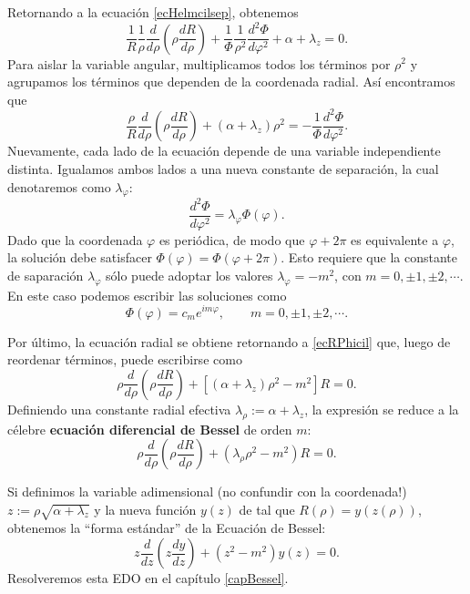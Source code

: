 Retornando a la ecuación \eqref{ecHelmcilsep}, obtenemos
\begin{equation}
\frac{1}{R}\frac{1}{\rho}\frac{d}{d \rho}\left(\rho \frac{dR}{d \rho}\right) + \frac{1}{\Phi}\frac{1}{\rho^2}\frac{d^2 \Phi}{d \varphi^2} + \alpha +\lambda_z = 0.
\end{equation}
Para aislar la variable angular, multiplicamos todos los términos por $\rho^2$ y agrupamos los términos que dependen de la coordenada radial. Así encontramos que
\begin{equation}\label{ecRPhicil}
\frac{\rho}{R}\frac{d}{d \rho}\left(\rho \frac{dR}{d \rho}\right) + (\alpha +\lambda_z)\rho^2 = -\frac{1}{\Phi}\frac{d^2 \Phi}{d \varphi^2}.
\end{equation}
Nuevamente, cada lado de la ecuación depende de una variable independiente distinta. Igualamos ambos lados a una nueva constante de separación, la cual denotaremos como $\lambda_\varphi$:
\begin{equation}
\frac{d^2 \Phi}{d \varphi^2} = \lambda_\varphi \Phi(\varphi).
\end{equation}
Dado que la coordenada $\varphi$ es periódica, de modo que $\varphi+2\pi$ es equivalente a $\varphi$, la solución debe satisfacer $\Phi(\varphi) = \Phi(\varphi + 2\pi)$. Esto requiere que la constante de saparación $\lambda_\varphi$ sólo puede adoptar los valores $\lambda_\varphi = -m^2$, con $m = 0,\pm 1, \pm 2, \cdots$. En este caso podemos escribir las soluciones como
\begin{equation}
\Phi(\varphi) = c_m e^{im\varphi}, \qquad m = 0,\pm 1, \pm 2, \cdots.
\end{equation}

Por último, la ecuación radial se obtiene retornando a \eqref{ecRPhicil} que, luego de reordenar términos, puede escribirse como
\begin{equation}
\rho\frac{d}{d \rho}\left(\rho \frac{dR}{d \rho}\right)+ \left[(\alpha + \lambda_z)\rho^2 - m^2\right]R = 0.
\end{equation}
Definiendo una constante radial efectiva $\lambda_\rho := \alpha + \lambda_z$, la expresión se reduce a la célebre \textbf{ecuación diferencial de Bessel} de orden $m$:
\begin{equation}
\rho\frac{d}{d \rho}\left(\rho \frac{dR}{d \rho}\right) + \left(\lambda_\rho\rho^2 - m^2\right)R = 0.
\end{equation}

Si definimos la variable adimensional (no confundir con la coordenada!) $z:= \rho \sqrt{\alpha + \lambda_z}$ y la nueva función $y(z)$ de tal que $R(\rho)=y(z(\rho))$, obtenemos la ``forma estándar'' de la Ecuación de Bessel:
\begin{equation}
z\frac{d}{dz}\left(z\frac{dy}{dz}\right) + \left(z^2 - m^2\right)y(z) = 0.
\end{equation}
Resolveremos esta EDO en el capítulo \ref{capBessel}.